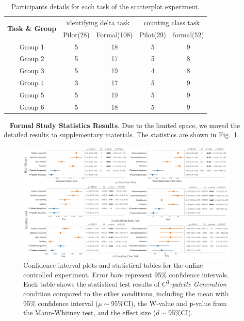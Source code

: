\documentclass[review,onecolumn]{vgtc}                %
\newcommand{\myparagraph}[1]{\mbox{\ } \newline \noindent \textbf{#1}}
\renewcommand{\paragraph}[1]{\myparagraph{#1}}
\begin{document}
\begin{table}[ht]
\renewcommand\arraystretch{1}
\centering
\caption{Participants details for each task of the scatterplot experiment.}
\label{tab:participantDetail}
\begin{tabular}{|c|c|c|c|c|}
\hline
\multirow{2}{*}{\textbf{Task \& Group}} & \multicolumn{2}{c|}{identifying delta task} & \multicolumn{2}{c|}{counting class task} \\
\cline{2-5}
& Pilot(28) & Formal(108) & Pilot(29) & formal(52) \\
\hline
Group 1 & 5 & 18 & 5  & 9 \\
\hline
Group 2 & 5 & 17 & 5  & 8 \\
\hline
Group 3 & 5 & 19 & 4  & 8 \\
\hline
Group 4 & 3 & 17 & 5  & 9 \\
\hline
Group 5 & 5 & 19 & 5  & 9 \\
\hline
Group 6 & 5 & 18 & 5  & 9 \\
\hline
\end{tabular}
\end{table}

\paragraph{Formal Study Statistics Results}.
Due to the limited space, we moved the detailed results to supplementary materials. The statistics are shown in Fig.~\ref{fig:formalStudy}.

\begin{figure}[h]
\centering
\includegraphics[width=1\linewidth]{formal-statistics-results.pdf}
\caption{Confidence interval plots and statistical tables for the online controlled experiment. Error bars represent 95\% confidence intervals. Each table shows the statistical test results of \emph{$C^3$-palette Generation} condition compared to the other conditions, including the mean with 95\% confidence interval ($\mu\sim$95\%CI), the W-value and p-value from the Mann-Whitney test, and the effect size ($d\sim$95\%CI).
}
\vspace*{-5mm}
\label{fig:formalStudy}
\end{figure}
\end{document}
